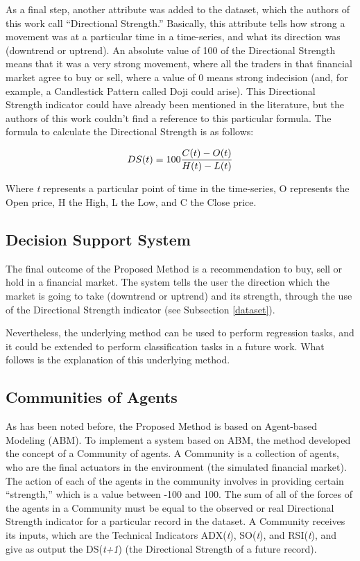 \documentclass[12pt,journal,draftcls,onecolumn]{IEEEtran}
\begin{document}
As a final step, another attribute was added to the dataset, which the authors of this work call ``Directional Strength.'' Basically, this attribute tells how strong a movement was at a particular time in a time-series, and what its direction was (downtrend or uptrend). An absolute value of 100 of the Directional Strength means that it was a very strong movement, where all the traders in that financial market agree to buy or sell, where a value of 0 means strong indecision (and, for example, a Candlestick Pattern called Doji could arise). This Directional Strength indicator could have already been mentioned in the literature, but the authors of this work couldn't find a reference to this particular formula. The formula to calculate the Directional Strength is as follows:

\begin{equation} \label{directional-strength}
  DS(t) = 100{{C(t) - O(t)} \over {H(t) - L(t)}}
\end{equation}

Where \textit{t} represents a particular point of time in the time-series, O represents the Open price, H the High, L the Low, and C the Close price.

\subsection{Decision Support System}

The final outcome of the Proposed Method is a recommendation to buy, sell or hold in a financial market. The system tells the user the direction which the market is going to take (downtrend or uptrend) and its strength, through the use of the Directional Strength indicator (see Subsection \ref{dataset}).

Nevertheless, the underlying method can be used to perform regression tasks, and it could be extended to perform classification tasks in a future work. What follows is the explanation of this underlying method.

\subsection{Communities of Agents}
\label{communities-of-agents}

As has been noted before, the Proposed Method is based on Agent-based Modeling (ABM). To implement a system based on ABM, the method developed the concept of a Community of agents. A Community is a collection of agents, who are the final actuators in the environment (the simulated financial market). The action of each of the agents in the community involves in providing certain ``strength,'' which is a value between -100 and 100. The sum of all of the forces of the agents in a Community must be equal to the observed or real Directional Strength indicator for a particular record in the dataset. A Community receives its inputs, which are the Technical Indicators ADX(\textit{t}), SO(\textit{t}), and RSI(\textit{t}), and give as output the DS(\textit{t+1}) (the Directional Strength of a future record).
\end{document}
